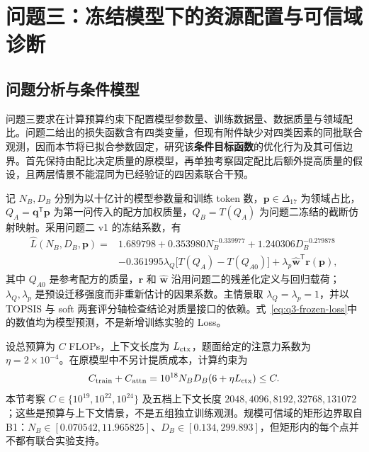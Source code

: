 \section{问题三：冻结模型下的资源配置与可信域诊断}
\label{sec:q3-resource}

\subsection{问题分析与条件模型}

问题三要求在计算预算约束下配置模型参数量、训练数据量、数据质量与领域配比。问题二给出的损失函数含有四类变量，但现有附件缺少对四类因素的同批联合观测，因而本节将已拟合参数固定，研究该\textbf{条件目标函数}的优化行为及其可信边界。首先保持由配比决定质量的原模型，再单独考察固定配比后额外提高质量的假设，且两层情景不能混同为已经验证的四因素联合干预。

记 $N_B,D_B$ 分别为以十亿计的模型参数量和训练 token 数，$\boldsymbol p\in\Delta_{17}$ 为领域占比，$Q_A=\boldsymbol q^{\mathsf T}\boldsymbol p$ 为第一问传入的配方加权质量，$Q_B=T(Q_A)$ 为问题二冻结的截断仿射映射。采用问题二 v1 的冻结系数，有
\begin{equation}
\begin{aligned}
\widehat L(N_B,D_B,\boldsymbol p)
={}&1.689798+0.353980N_B^{-0.339977}+1.240306D_B^{-0.279878}\\
&-0.361995\lambda_Q\bigl[T(Q_A)-T(Q_{A0})\bigr]
+\lambda_p\widehat{\boldsymbol w}^{\mathsf T}\boldsymbol r(\boldsymbol p),
\end{aligned}
\label{eq:q3-frozen-loss}
\end{equation}
其中 $Q_{A0}$ 是参考配方的质量，$\boldsymbol r$ 和 $\widehat{\boldsymbol w}$ 沿用问题二的残差化定义与回归载荷；$\lambda_Q,\lambda_p$ 是预设迁移强度而非重新估计的因果系数。主情景取 $\lambda_Q=\lambda_p=1$，并以 TOPSIS 与 soft 两套评分轴检查结论对质量接口的依赖。式~\eqref{eq:q3-frozen-loss}中的数值均为模型预测，不是新增训练实验的 Loss。

设总预算为 $C$ FLOPs，上下文长度为 $L_{\rm ctx}$，题面给定的注意力系数为 $\eta=2\times10^{-4}$。在原模型中不另计提质成本，计算约束为
\begin{equation}
C_{\rm train}+C_{\rm attn}
=10^{18}N_BD_B(6+\eta L_{\rm ctx})\leq C.
\label{eq:q3-budget-original}
\end{equation}
本节考察 $C\in\{10^{19},10^{22},10^{24}\}$ 及五档上下文长度 $2048,4096,8192,32768,131072$；这些是预算与上下文情景，不是五组独立训练观测。规模可信域的矩形边界取自 B1：$N_B\in[0.070542,11.965825]$、$D_B\in[0.134,299.893]$，但矩形内的每个点并不都有联合实验支持。

